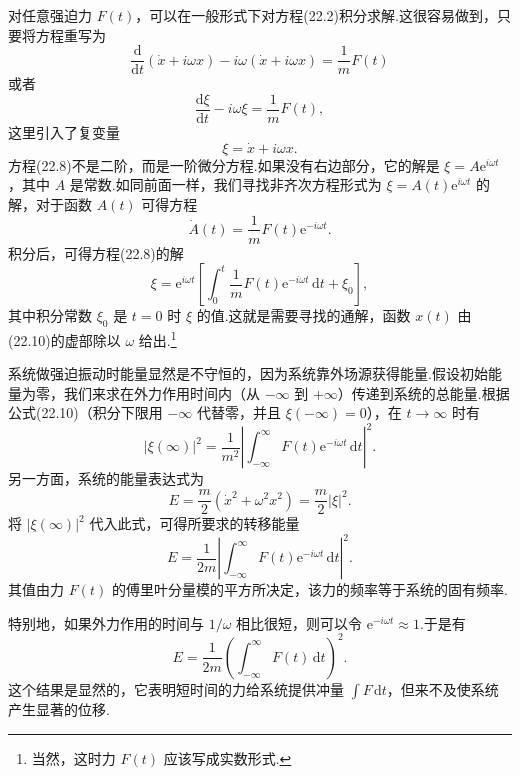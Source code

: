 对任意强迫力 $F(t)$，可以在一般形式下对方程(22.2)积分求解.这很容易做到，只要将方程重写为
\begin{equation*}
  \frac{\mathrm{d}}{\mathrm{d}t}\left(\dot{x}+i\omega x\right)
  -i\omega\left(\dot{x}+i\omega x\right)=\frac{1}{m}F(t)
\end{equation*}
或者
\begin{equation}
  \frac{\mathrm{d}\xi}{\mathrm{d}t}-i\omega\xi=\frac{1}{m}F(t),
\end{equation}
这里引入了复变量
\begin{equation}
  \xi=\dot{x}+i\omega x.
\end{equation}
方程(22.8)不是二阶，而是一阶微分方程.如果没有右边部分，它的解是 $\xi=A\mathrm{e}^{i\omega t}$，其中 $A$ 是常数.如同前面一样，我们寻找非齐次方程形式为 $\xi=A(t)\mathrm{e}^{i\omega t}$ 的解，对于函数 $A(t)$ 可得方程
\begin{equation*}
  \dot{A}(t)=\frac{1}{m}F(t)\mathrm{e}^{-i\omega t}.
\end{equation*}
积分后，可得方程(22.8)的解
\begin{equation}
  \xi=\mathrm{e}^{i\omega t}\left[\int_0^t\frac{1}{m}F(t)\mathrm{e}^{-i\omega t}\,\mathrm{d}t+\xi_0\right],
\end{equation}
其中积分常数 $\xi_0$ 是 $t=0$ 时 $\xi$ 的值.这就是需要寻找的通解，函数 $x(t)$ 由(22.10)的虚部除以 $\omega$ 给出.\footnote{当然，这时力 $F(t)$ 应该写成实数形式.}

系统做强迫振动时能量显然是不守恒的，因为系统靠外场源获得能量.假设初始能量为零，我们来求在外力作用时间内（从 $-\infty$ 到 $+\infty$）传递到系统的总能量.根据公式(22.10)（积分下限用 $-\infty$ 代替零，并且 $\xi(-\infty)=0$），在 $t\to\infty$ 时有
\begin{equation*}
  \left|\xi(\infty)\right|^2
  =\frac{1}{m^2}\left|\int_{-\infty}^{\infty}F(t)\mathrm{e}^{-i\omega t}\,\mathrm{d}t\right|^2.
\end{equation*}
另一方面，系统的能量表达式为
\begin{equation}
  E=\frac{m}{2}\left(\dot{x}^2+\omega^2x^2\right)=\frac{m}{2}|\xi|^2.
\end{equation}
将 $|\xi(\infty)|^2$ 代入此式，可得所要求的转移能量
\begin{equation}
  E=\frac{1}{2m}\left|\int_{-\infty}^{\infty}F(t)\mathrm{e}^{-i\omega t}\,\mathrm{d}t\right|^2.
\end{equation}
其值由力 $F(t)$ 的傅里叶分量模的平方所决定，该力的频率等于系统的固有频率.

特别地，如果外力作用的时间与 $1/\omega$ 相比很短，则可以令 $\mathrm{e}^{-i\omega t}\approx1$.于是有
\begin{equation*}
  E=\frac{1}{2m}\left(\int_{-\infty}^{\infty}F(t)\,\mathrm{d}t\right)^2.
\end{equation*}
这个结果是显然的，它表明短时间的力给系统提供冲量 $\int F\,\mathrm{d}t$，但来不及使系统产生显著的位移.

